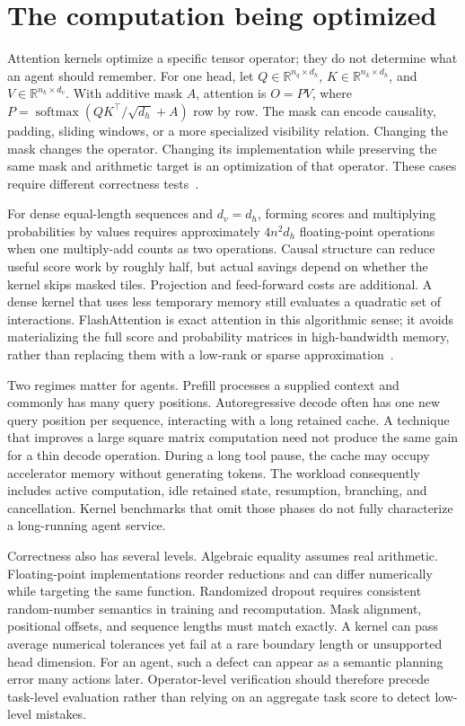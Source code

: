 \section{The computation being optimized}
\label{sec:C04:operator}
Attention kernels optimize a specific tensor operator; they do not determine what an agent should remember. For one head, let $Q\in\mathbb R^{n_q\times d_h}$, $K\in\mathbb R^{n_k\times d_h}$, and $V\in\mathbb R^{n_k\times d_v}$. With additive mask $A$, attention is $O=PV$, where $P=\operatorname{softmax}(QK^\top/\sqrt{d_h}+A)$ row by row. The mask can encode causality, padding, sliding windows, or a more specialized visibility relation. Changing the mask changes the operator. Changing its implementation while preserving the same mask and arithmetic target is an optimization of that operator. These cases require different correctness tests~\cite{vaswani2017attention,dao2022flashattention}.

For dense equal-length sequences and $d_v=d_h$, forming scores and multiplying probabilities by values requires approximately $4n^2d_h$ floating-point operations when one multiply-add counts as two operations. Causal structure can reduce useful score work by roughly half, but actual savings depend on whether the kernel skips masked tiles. Projection and feed-forward costs are additional. A dense kernel that uses less temporary memory still evaluates a quadratic set of interactions. FlashAttention is exact attention in this algorithmic sense; it avoids materializing the full score and probability matrices in high-bandwidth memory, rather than replacing them with a low-rank or sparse approximation~\cite{dao2022flashattention}.

Two regimes matter for agents. Prefill processes a supplied context and commonly has many query positions. Autoregressive decode often has one new query position per sequence, interacting with a long retained cache. A technique that improves a large square matrix computation need not produce the same gain for a thin decode operation. During a long tool pause, the cache may occupy accelerator memory without generating tokens. The workload consequently includes active computation, idle retained state, resumption, branching, and cancellation. Kernel benchmarks that omit those phases do not fully characterize a long-running agent service.

Correctness also has several levels. Algebraic equality assumes real arithmetic. Floating-point implementations reorder reductions and can differ numerically while targeting the same function. Randomized dropout requires consistent random-number semantics in training and recomputation. Mask alignment, positional offsets, and sequence lengths must match exactly. A kernel can pass average numerical tolerances yet fail at a rare boundary length or unsupported head dimension. For an agent, such a defect can appear as a semantic planning error many actions later. Operator-level verification should therefore precede task-level evaluation rather than relying on an aggregate task score to detect low-level mistakes.

